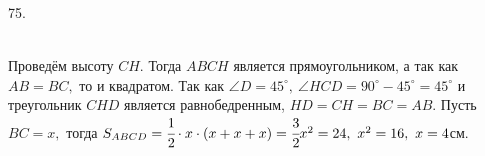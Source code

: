 75. \begin{figure}[ht!]
\end{figure}\\
Проведём высоту $CH.$ Тогда $ABCH$ является прямоугольником, а так как $AB=BC,$ то и квадратом. Так как $\angle D=45^\circ,\ \angle HCD=90^\circ-45^\circ=45^\circ$ и треугольник $CHD$ является равнобедренным, $HD=CH=BC=AB.$ Пусть $BC=x,$ тогда $S_{ABCD}=\cfrac{1}{2}\cdot{x}\cdot(x+x+x)=\cfrac{3}{2}x^2=24,\ x^2=16,\ x=4$см.\\
